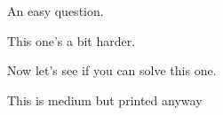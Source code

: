 \documentclass{article}
\begin{document}
\begin{exercise}[difficulty=easy]
  An easy question.
\end{exercise}
\begin{exercise}[difficulty=medium]
  This one's a bit harder.
\end{exercise}
\begin{exercise}[difficulty=hard]
  Now let’s see if you can solve this one.
\end{exercise}
\begin{exercise}[difficulty=medium]
  This is medium but printed anyway
\end{exercise}
\end{document}
